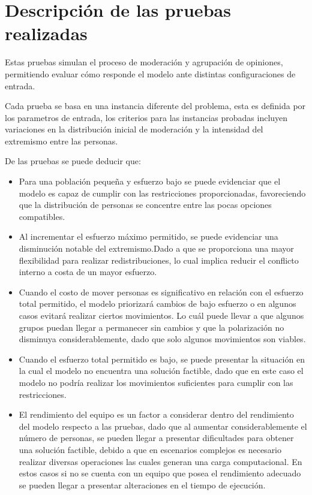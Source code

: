 \documentclass[11pt,letter]{article}
\begin{document}
\section{Descripción de las pruebas realizadas}
Estas pruebas simulan el proceso de moderación y agrupación de opiniones, permitiendo evaluar cómo responde el modelo ante distintas configuraciones de entrada.

Cada prueba se basa en una instancia diferente del problema, esta es definida por los parametros de entrada, los criterios para las instancias probadas incluyen variaciones en la distribución inicial de moderación y la intensidad del extremismo entre las personas.

De las pruebas se puede deducir que:
\begin{itemize}
    \item Para una población pequeña y esfuerzo bajo se puede evidenciar que el modelo es capaz de cumplir con las restricciones proporcionadas, favoreciendo que la distribución de personas se concentre entre las pocas opciones compatibles.

    \item Al incrementar el esfuerzo máximo permitido, se puede evidenciar una disminución notable del extremismo.Dado a que se proporciona una mayor flexibilidad para realizar redistribuciones, lo cual implica reducir el conflicto interno a costa de un mayor esfuerzo.

    \item Cuando el costo de mover personas es significativo en relación con el esfuerzo total permitido, el modelo priorizará cambios de bajo esfuerzo o en algunos casos evitará realizar ciertos movimientos. Lo cuál puede llevar a que algunos grupos puedan llegar a permanecer sin cambios y que la polarización no disminuya considerablemente, dado que solo algunos movimientos son viables.

    \item Cuando el esfuerzo total permitido es bajo, se puede presentar la situación en la cual el modelo no encuentra una solución factible, dado que en este caso el modelo no podría realizar los movimientos suficientes para cumplir con las restricciones.

    \item El rendimiento del equipo es un factor a considerar dentro del rendimiento del modelo respecto a las pruebas, dado que al aumentar considerablemente el número de personas, se pueden llegar a presentar dificultades para obtener una solución factible, debido a que en escenarios complejos es necesario realizar diversas operaciones las cuales generan una carga computacional. En estos casos si no se cuenta con un equipo que posea el rendimiento adecuado se pueden llegar a presentar alteraciones en el tiempo de ejecución.


\end{itemize}
\end{document}

